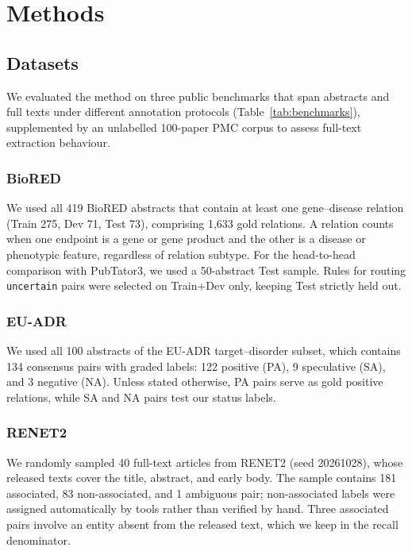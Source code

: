 \documentclass[preprint,10pt,letterpaper]{elsarticle}
\newcommand{\st}[1]{\texttt{#1}}             %
\begin{document}
\section{Methods}

\subsection{Datasets}
We evaluated the method on three public benchmarks that span abstracts and full texts under different annotation protocols (Table~\ref{tab:benchmarks}), supplemented by an unlabelled 100-paper PMC corpus to assess full-text extraction behaviour.

\subsubsection{BioRED}
We used all 419 BioRED abstracts that contain at least one gene--disease relation (Train 275, Dev 71, Test 73), comprising 1,633 gold relations. A relation counts when one endpoint is a gene or gene product and the other is a disease or phenotypic feature, regardless of relation subtype. For the head-to-head comparison with PubTator3, we used a 50-abstract Test sample. Rules for routing \st{uncertain} pairs were selected on Train+Dev only, keeping Test strictly held out.

\subsubsection{EU-ADR}
We used all 100 abstracts of the EU-ADR target--disorder subset, which contains 134 consensus pairs with graded labels: 122 positive (PA), 9 speculative (SA), and 3 negative (NA). Unless stated otherwise, PA pairs serve as gold positive relations, while SA and NA pairs test our status labels.

\subsubsection{RENET2}
We randomly sampled 40 full-text articles from RENET2 (seed 20261028), whose released texts cover the title, abstract, and early body. The sample contains 181 associated, 83 non-associated, and 1 ambiguous pair; non-associated labels were assigned automatically by tools rather than verified by hand. Three associated pairs involve an entity absent from the released text, which we keep in the recall denominator.
\end{document}
